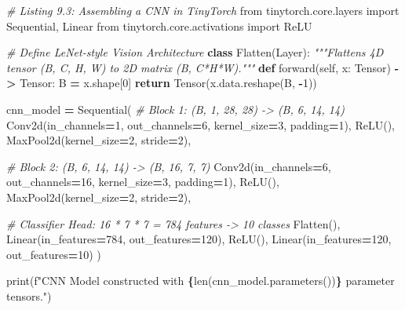 \documentclass[
  letterpaper,
]{scrbook}
\newenvironment{Shaded}{\begin{snugshade}}{\end{snugshade}}
\newcommand{\BuiltInTok}[1]{#1}
\newcommand{\CommentTok}[1]{\textcolor[rgb]{0.56,0.35,0.01}{\textit{#1}}}
\newcommand{\ControlFlowTok}[1]{\textcolor[rgb]{0.13,0.29,0.53}{\textbf{#1}}}
\newcommand{\DecValTok}[1]{\textcolor[rgb]{0.00,0.00,0.81}{#1}}
\newcommand{\ImportTok}[1]{#1}
\newcommand{\KeywordTok}[1]{\textcolor[rgb]{0.13,0.29,0.53}{\textbf{#1}}}
\newcommand{\NormalTok}[1]{#1}
\newcommand{\OperatorTok}[1]{\textcolor[rgb]{0.81,0.36,0.00}{\textbf{#1}}}
\newcommand{\SpecialCharTok}[1]{\textcolor[rgb]{0.81,0.36,0.00}{\textbf{#1}}}
\newcommand{\SpecialStringTok}[1]{\textcolor[rgb]{0.31,0.60,0.02}{#1}}
\newcommand{\VariableTok}[1]{\textcolor[rgb]{0.00,0.00,0.00}{#1}}
\begin{document}
\begin{Shaded}
\begin{Highlighting}[]
\CommentTok{\# Listing 9.3: Assembling a CNN in TinyTorch}
\ImportTok{from}\NormalTok{ tinytorch.core.layers }\ImportTok{import}\NormalTok{ Sequential, Linear}
\ImportTok{from}\NormalTok{ tinytorch.core.activations }\ImportTok{import}\NormalTok{ ReLU}

\CommentTok{\# Define LeNet{-}style Vision Architecture}
\KeywordTok{class}\NormalTok{ Flatten(Layer):}
    \CommentTok{"""Flattens 4D tensor (B, C, H, W) to 2D matrix (B, C*H*W)."""}
    \KeywordTok{def}\NormalTok{ forward(}\VariableTok{self}\NormalTok{, x: Tensor) }\OperatorTok{{-}\textgreater{}}\NormalTok{ Tensor:}
\NormalTok{        B }\OperatorTok{=}\NormalTok{ x.shape[}\DecValTok{0}\NormalTok{]}
        \ControlFlowTok{return}\NormalTok{ Tensor(x.data.reshape(B, }\OperatorTok{{-}}\DecValTok{1}\NormalTok{))}

\NormalTok{cnn\_model }\OperatorTok{=}\NormalTok{ Sequential(}
    \CommentTok{\# Block 1: (B, 1, 28, 28) {-}\textgreater{} (B, 6, 14, 14)}
\NormalTok{    Conv2d(in\_channels}\OperatorTok{=}\DecValTok{1}\NormalTok{, out\_channels}\OperatorTok{=}\DecValTok{6}\NormalTok{, kernel\_size}\OperatorTok{=}\DecValTok{3}\NormalTok{, padding}\OperatorTok{=}\DecValTok{1}\NormalTok{),}
\NormalTok{    ReLU(),}
\NormalTok{    MaxPool2d(kernel\_size}\OperatorTok{=}\DecValTok{2}\NormalTok{, stride}\OperatorTok{=}\DecValTok{2}\NormalTok{),}

    \CommentTok{\# Block 2: (B, 6, 14, 14) {-}\textgreater{} (B, 16, 7, 7)}
\NormalTok{    Conv2d(in\_channels}\OperatorTok{=}\DecValTok{6}\NormalTok{, out\_channels}\OperatorTok{=}\DecValTok{16}\NormalTok{, kernel\_size}\OperatorTok{=}\DecValTok{3}\NormalTok{, padding}\OperatorTok{=}\DecValTok{1}\NormalTok{),}
\NormalTok{    ReLU(),}
\NormalTok{    MaxPool2d(kernel\_size}\OperatorTok{=}\DecValTok{2}\NormalTok{, stride}\OperatorTok{=}\DecValTok{2}\NormalTok{),}

    \CommentTok{\# Classifier Head: 16 * 7 * 7 = 784 features {-}\textgreater{} 10 classes}
\NormalTok{    Flatten(),}
\NormalTok{    Linear(in\_features}\OperatorTok{=}\DecValTok{784}\NormalTok{, out\_features}\OperatorTok{=}\DecValTok{120}\NormalTok{),}
\NormalTok{    ReLU(),}
\NormalTok{    Linear(in\_features}\OperatorTok{=}\DecValTok{120}\NormalTok{, out\_features}\OperatorTok{=}\DecValTok{10}\NormalTok{)}
\NormalTok{)}

\BuiltInTok{print}\NormalTok{(}\SpecialStringTok{f"CNN Model constructed with }\SpecialCharTok{\{}\BuiltInTok{len}\NormalTok{(cnn\_model.parameters())}\SpecialCharTok{\}}\SpecialStringTok{ parameter tensors."}\NormalTok{)}
\end{Highlighting}
\end{Shaded}
\end{document}
